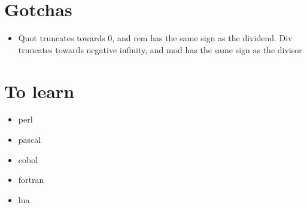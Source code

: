 \documentclass{article}
\begin{document}
\section{Gotchas}
\begin{itemize}
	\item Quot truncates towards 0, and rem has the same sign as the dividend. Div truncates towards negative infinity, and mod has the same sign as the divisor
\end{itemize}

\section{To learn}
\begin{itemize}
	\item perl
	\item pascal
	\item cobol
	\item fortran
	\item lua
\end{itemize}
\end{document}
